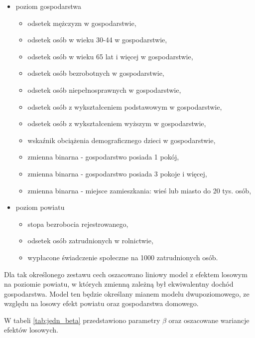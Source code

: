 \begin{itemize}
\item poziom gospodarstwa
\begin{itemize}
\item odsetek mężczyzn w gospodarstwie,
\item odsetek osób w wieku 30-44 w gospodarstwie,
\item odsetek osób w wieku 65 lat i więcej w gospodarstwie,
\item odsetek osób bezrobotnych w gospodarstwie,
\item odsetek osób niepełnosprawnych w gospodarstwie,
\item odsetek osób z wykształceniem podstawowym w gospodarstwie,
\item odsetek osób z wykształceniem wyższym w gospodarstwie,
\item wskaźnik obciążenia demograficznego dzieci w gospodarstwie,
\item zmienna binarna - gospodarstwo posiada 1 pokój,
\item zmienna binarna - gospodarstwo posiada 3 pokoje i więcej,
\item zmienna binarna - miejsce zamieszkania: wieś lub miasto do 20 tys. osób,
\end{itemize}
\item poziom powiatu
\begin{itemize}
\item stopa bezrobocia rejestrowanego,
\item odsetek osób zatrudnionych w rolnictwie,
\item wypłacone świadczenie społeczne na 1000 zatrudnionych osób.
\end{itemize}
\end{itemize}

Dla tak określonego zestawu cech oszacowano liniowy model z efektem losowym na poziomie powiatu, w których zmienną zależną był ekwiwalentny dochód gospodarstwa. Model ten będzie określany mianem modelu dwupoziomowego, ze względu na losowy efekt powiatu oraz gospodarstwa domowego.

W tabeli \ref{tab:jedn_beta} przedstawiono parametry $\beta$ oraz oszacowane wariancje efektów losowych.

